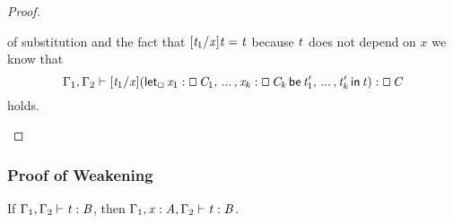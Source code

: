 \begin{proof}
\begin{itemize}
  of substitution and the fact that $[  \mathit{t_{{\mathrm{1}}}}  /  \mathit{x}  ]  \mathit{t} = \mathit{t}$ because $\mathit{t}$ does not depend on $\mathit{x}$ we know that
  \[ \Gamma_{{\mathrm{1}}}  ,  \Gamma_{{\mathrm{2}}}  \vdash  [  \mathit{t_{{\mathrm{1}}}}  /  \mathit{x}  ]  (   \mathsf{let}_\oblong\, \mathit{x_{{\mathrm{1}}}}  :  \oblong \, \mathit{C_{{\mathrm{1}}}}  , \, ... \, ,  \mathit{x_{\mathit{k}}}  :  \oblong \, \mathit{C_{\mathit{k}}} \,\mathsf{be}\, \mathit{t'_{{\mathrm{1}}}}  , \, ... \, ,  \mathit{t'_{\mathit{k}}} \,\mathsf{in}\, \mathit{t}   )  :  \oblong \, \mathit{C} \] holds.
\end{itemize}
\end{proof}

\subsubsection{Proof of Weakening}
\label{subsubsec:proof_of_lemma:weakening}

\begin{lemma*}[Weakening]
  If $\Gamma_{{\mathrm{1}}}  ,  \Gamma_{{\mathrm{2}}}  \vdash  \mathit{t}  :  \mathit{B}$, then $\Gamma_{{\mathrm{1}}}  ,  \mathit{x}  :  \mathit{A}  ,  \Gamma_{{\mathrm{2}}}  \vdash  \mathit{t}  :  \mathit{B}$.
\end{lemma*}

